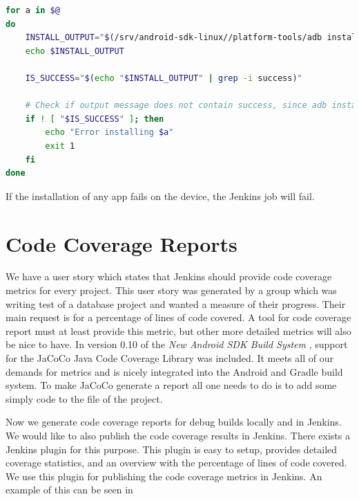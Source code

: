 \begin{lstlisting}[language=bash,showstringspaces=false,caption=Script that installs the given APKs to an Android device,label=lst:install_apks_on_android_device]
for a in $@
do
    INSTALL_OUTPUT="$(/srv/android-sdk-linux//platform-tools/adb install $a)"
    echo $INSTALL_OUTPUT

    IS_SUCCESS="$(echo "$INSTALL_OUTPUT" | grep -i success)"

    # Check if output message does not contain success, since adb install does not provide exit code != 0 at failure
    if ! [ "$IS_SUCCESS" ]; then
        echo "Error installing $a"
        exit 1
    fi
done
\end{lstlisting}

If the installation of any app fails on the device, the Jenkins job will fail.

\section{Code Coverage Reports}\label{sec:s3_linecoverage}
We have a user story which states that Jenkins should provide code coverage metrics for every project. This user story was generated by a group which was writing test of a database project and wanted a measure of their progress. Their main request is for a percentage of lines of code covered. A tool for code coverage report must at least provide this metric, but other more detailed metrics will also be nice to have. In version 0.10 of the \emph{New Android SDK Build System} \parencite{new-build-android}, support for the JaCoCo \parencite{jacoco-home} Java Code Coverage Library was included. It meets all of our demands for metrics and is nicely integrated into the Android and Gradle build system. To make JaCoCo generate a report all one needs to do is to add some simply code to the  file of the project.

Now we generate code coverage reports for debug builds locally and in Jenkins. We would like to also publish the code coverage results in Jenkins. There exists a Jenkins plugin \parencite{jacoco-jenkins-plugin} for this purpose. This plugin is easy to setup, provides detailed coverage statistics, and an overview with the percentage of lines of code covered. We use this plugin for publishing the code coverage metrics in Jenkins. An example of this can be seen in 


